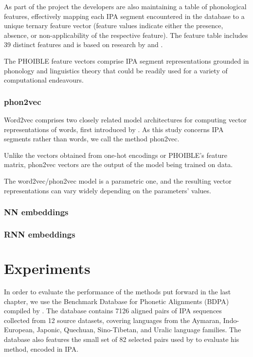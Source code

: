 \documentclass[a4paper]{report}
\begin{document}
As part of the project the developers are also maintaining a table of phonological features,
effectively mapping each IPA segment encountered in the database to a unique ternary feature vector
(feature values indicate either the presence, absence, or non-applicability of the respective feature).
The feature table includes 39 distinct features and is based on research by \citet{2009_Bruce} and \citet{2011_Moisik_al}.

The PHOIBLE feature vectors comprise IPA segment representations grounded in phonology and linguistics theory
that could be readily used for a variety of computational endeavours.


\subsection{phon2vec}

Word2vec comprises two closely related model architectures for computing vector representations of words, first introduced by \citet{2013_Mikolov_al}.
As this study concerns IPA segments rather than words, we call the method phon2vec.

Unlike the vectors obtained from one-hot encodings or PHOIBLE's feature matrix, phon2vec vectors are the output of the model being trained on data.

The word2vec/phon2vec model is a parametric one, and the resulting vector representations can vary widely depending on the parameters' values.


\subsection{NN embeddings}

\subsection{RNN embeddings}




\chapter{Experiments}

In order to evaluate the performance of the methods put forward in the last chapter,
we use the Benchmark Database for Phonetic Alignments (BDPA) compiled by \citet{2014_List_Prokić}.
The database contains 7126 aligned pairs of IPA sequences collected from 12 source datasets,
covering languages from the Aymaran, Indo-European, Japonic, Quechuan, Sino-Tibetan, and Uralic language families.
The database also features the small set of 82 selected pairs used by \citet{1996_Covington} to evaluate his method, encoded in IPA.
\end{document}
